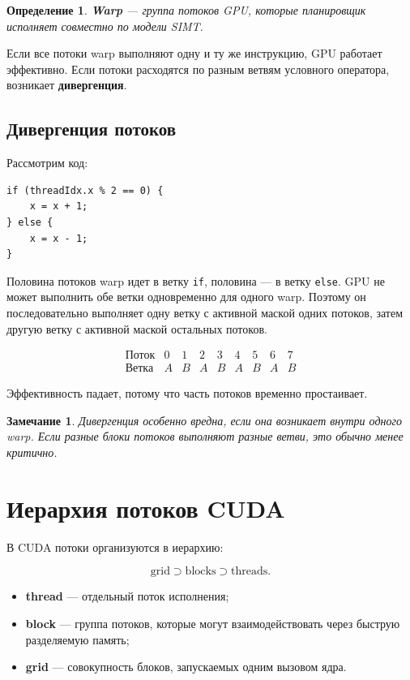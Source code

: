 \documentclass[12pt,a4paper]{article}
\newtheorem{definition}{Определение}
\newtheorem{remark}{Замечание}
\begin{document}
\begin{definition}
\textbf{Warp} --- группа потоков GPU, которые планировщик исполняет совместно по модели SIMT.
\end{definition}

Если все потоки warp выполняют одну и ту же инструкцию, GPU работает эффективно. Если потоки расходятся по разным ветвям условного оператора, возникает \textbf{дивергенция}.

\subsection{Дивергенция потоков}

Рассмотрим код:

\begin{lstlisting}[style=cuda]
if (threadIdx.x % 2 == 0) {
    x = x + 1;
} else {
    x = x - 1;
}
\end{lstlisting}

Половина потоков warp идет в ветку \texttt{if}, половина --- в ветку \texttt{else}. GPU не может выполнить обе ветки одновременно для одного warp. Поэтому он последовательно выполняет одну ветку с активной маской одних потоков, затем другую ветку с активной маской остальных потоков.

\[
\begin{array}{c|cccccccc}
\text{Поток} & 0 & 1 & 2 & 3 & 4 & 5 & 6 & 7 \\
\hline
\text{Ветка} & A & B & A & B & A & B & A & B
\end{array}
\]

Эффективность падает, потому что часть потоков временно простаивает.

\begin{remark}
Дивергенция особенно вредна, если она возникает внутри одного warp. Если разные блоки потоков выполняют разные ветви, это обычно менее критично.
\end{remark}

\section{Иерархия потоков CUDA}

В CUDA потоки организуются в иерархию:

\[
    \text{grid} \supset \text{blocks} \supset \text{threads}.
\]

\begin{itemize}
    \item \textbf{thread} --- отдельный поток исполнения;
    \item \textbf{block} --- группа потоков, которые могут взаимодействовать через быструю разделяемую память;
    \item \textbf{grid} --- совокупность блоков, запускаемых одним вызовом ядра.
\end{itemize}
\end{document}
